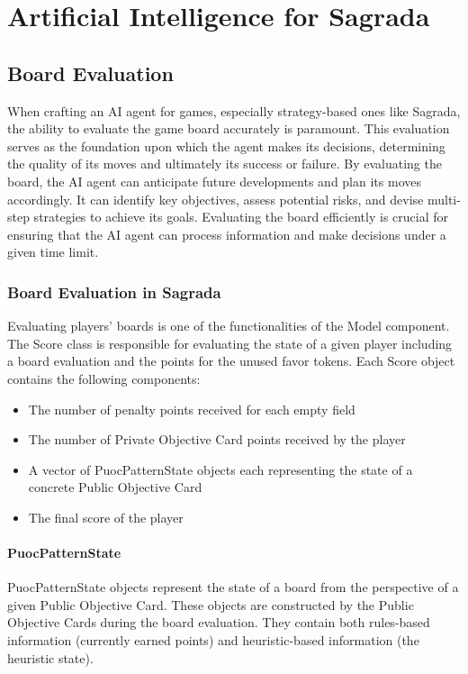 \chapter{Artificial Intelligence for Sagrada}

\section{Board Evaluation}

When crafting an AI agent for games, especially strategy-based ones like Sagrada, the ability to evaluate the 
game board accurately is paramount. This evaluation serves as the foundation upon which the agent makes its decisions, 
determining the quality of its moves and ultimately its success or failure. By evaluating the board, the AI agent can 
anticipate future developments and plan its moves accordingly. It can identify key objectives, assess potential risks, 
and devise multi-step strategies to achieve its goals.  Evaluating the board efficiently is crucial for ensuring that 
the AI agent can process information and make decisions under a given time limit. 

\subsection{Board Evaluation in Sagrada} \label{subsec:Board_Evaluation_In_Sagrada}

Evaluating players' boards is one of the functionalities of the Model component. The Score class is responsible for evaluating
the state of a given player including a board evaluation and the points for the unused favor tokens. Each Score object contains
the following components:
\begin{itemize}
    \item The number of penalty points received for each empty field
    \item The number of Private Objective Card points received by the player
    \item A vector of PuocPatternState objects each representing the state of a concrete Public Objective Card
    \item The final score of the player
\end{itemize}

\subsubsection{PuocPatternState}
PuocPatternState objects represent the state of a board from the perspective of a given Public Objective Card. These objects
are constructed by the Public Objective Cards during the board evaluation. They contain both rules-based information 
(currently earned points) and heuristic-based information (the heuristic state).

